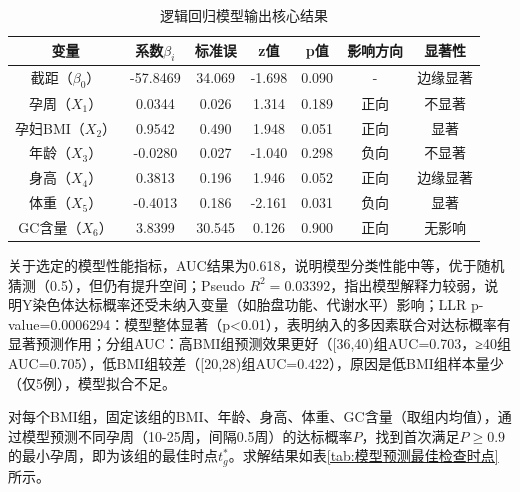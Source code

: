 \documentclass[withoutpreface,bwprint]{cumcmthesis} %
\begin{document}
\begin{table}[H]
    \centering  %
    \caption{逻辑回归模型输出核心结果}  %
    \label{tab:模型拟合输出核心结果}  %
    \begin{threeparttable}
        \begin{tabularx}{0.9\textwidth}{c c c c c c c}
            \toprule[1.5pt]
            \textbf{变量} & \textbf{系数$\beta_i$} & \textbf{标准误} & \textbf{z值}& \textbf{p值}& \textbf{影响方向}& \textbf{显著性}\\ 
            \midrule[1pt]
            截距（$\beta_0$）&  -57.8469& 34.069  & -1.698 & 0.090  & -     & 边缘显著\\  
            孕周（$X_1$）    & 0.0344  & 0.026   & 1.314  & 0.189  & 正向    & 不显著   \\ 
            孕妇BMI（$X_2$） &  0.9542  & 0.490   & 1.948  & 0.051  & 正向    & 显著    \\  
            年龄（$X_3$）    & -0.0280 & 0.027   & -1.040 & 0.298  & 负向    & 不显著   \\ 
            身高（$X_4$）    & 0.3813  & 0.196   & 1.946  & 0.052  & 正向    & 边缘显著 \\ 
            体重（$X_5$）    & -0.4013 & 0.186   & -2.161 & 0.031  & 负向    & 显著     \\ 
            GC含量（$X_6$）  & 3.8399  & 30.545  & 0.126  & 0.900  & 正向    & 无影响   \\ 
            \bottomrule[1.5pt]
        \end{tabularx}
    \end{threeparttable}
\end{table}
关于选定的模型性能指标，AUC结果为0.618，说明模型分类性能中等，优于随机猜测（0.5），但仍有提升空间；Pseudo $R^2=0.03392$，指出模型解释力较弱，说明Y染色体达标概率还受未纳入变量（如胎盘功能、代谢水平）影响；LLR p-value=0.0006294：模型整体显著（p<0.01），表明纳入的多因素联合对达标概率有显著预测作用；分组AUC：高BMI组预测效果更好（[36,40)组AUC=0.703，≥40组AUC=0.705），低BMI组较差（[20,28)组AUC=0.422），原因是低BMI组样本量少（仅5例），模型拟合不足。  

对每个BMI组，固定该组的BMI、年龄、身高、体重、GC含量（取组内均值），通过模型预测不同孕周（10-25周，间隔0.5周）的达标概率$P$，找到首次满足$P≥0.9$的最小孕周，即为该组的最佳时点$t_g^*$。求解结果如表\ref{tab:模型预测最佳检查时点}所示。
\end{document}
